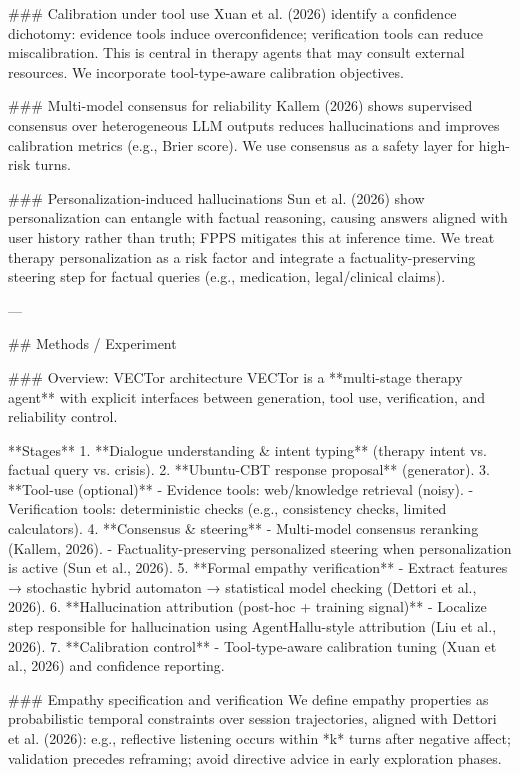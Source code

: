 ### Calibration under tool use  
Xuan et al. (2026) identify a confidence dichotomy: evidence tools induce overconfidence; verification tools can reduce miscalibration. This is central in therapy agents that may consult external resources. We incorporate tool-type-aware calibration objectives.

### Multi-model consensus for reliability  
Kallem (2026) shows supervised consensus over heterogeneous LLM outputs reduces hallucinations and improves calibration metrics (e.g., Brier score). We use consensus as a safety layer for high-risk turns.

### Personalization-induced hallucinations  
Sun et al. (2026) show personalization can entangle with factual reasoning, causing answers aligned with user history rather than truth; FPPS mitigates this at inference time. We treat therapy personalization as a risk factor and integrate a factuality-preserving steering step for factual queries (e.g., medication, legal/clinical claims).

---

## Methods / Experiment  

### Overview: VECTor architecture  
VECTor is a **multi-stage therapy agent** with explicit interfaces between generation, tool use, verification, and reliability control.

**Stages**  
1. **Dialogue understanding & intent typing** (therapy intent vs. factual query vs. crisis).  
2. **Ubuntu-CBT response proposal** (generator).  
3. **Tool-use (optional)**  
   - Evidence tools: web/knowledge retrieval (noisy).  
   - Verification tools: deterministic checks (e.g., consistency checks, limited calculators).  
4. **Consensus & steering**  
   - Multi-model consensus reranking (Kallem, 2026).  
   - Factuality-preserving personalized steering when personalization is active (Sun et al., 2026).  
5. **Formal empathy verification**  
   - Extract features → stochastic hybrid automaton → statistical model checking (Dettori et al., 2026).  
6. **Hallucination attribution (post-hoc + training signal)**  
   - Localize step responsible for hallucination using AgentHallu-style attribution (Liu et al., 2026).  
7. **Calibration control**  
   - Tool-type-aware calibration tuning (Xuan et al., 2026) and confidence reporting.

### Empathy specification and verification  
We define empathy properties as probabilistic temporal constraints over session trajectories, aligned with Dettori et al. (2026): e.g., reflective listening occurs within *k* turns after negative affect; validation precedes reframing; avoid directive advice in early exploration phases.

